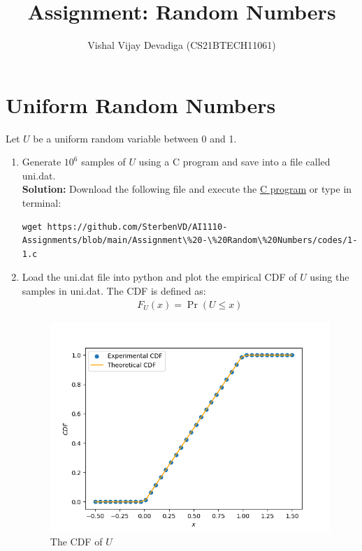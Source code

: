 \documentclass[journal,12pt,twocolumn]{IEEEtran}
\title{Assignment: Random Numbers}
\author{Vishal Vijay Devadiga (CS21BTECH11061)}
\date{}
\numberwithin{equation}{section}
\renewcommand\thesection{\arabic{section}}
\providecommand{\pr}[1]{\ensuremath{\Pr\left(#1\right)}}
\providecommand{\gitlink}[2]{{\color{blue}\href{https://github.com/SterbenVD/AI1110-Assignments/blob/main/Assignment\%20-\%20Random\%20Numbers/#1}{#2}}}
\newcommand{\solution}{\noindent \textbf{\\ Solution: }}
\begin{document}
\maketitle

\section{Uniform Random Numbers}
Let $U$ be a uniform random variable between 0 and 1.
\begin{enumerate}[label=\thesection.\arabic*,ref=\thesection.\theenumi]
    \item Generate $10^6$ samples of $U$ using a C program and save into a file called uni.dat.
          \solution Download the following file and execute the \gitlink{codes/1-1.c}{C program} or type in terminal:
          \begin{lstlisting}
wget https://github.com/SterbenVD/AI1110-Assignments/blob/main/Assignment\%20-\%20Random\%20Numbers/codes/1-1.c
            \end{lstlisting}
    \item
          Load the uni.dat file into python and plot the empirical CDF of $U$ using the samples in uni.dat.
          The CDF is defined as:
          \begin{align}
              F_{U}(x) = \pr{U \le x}
          \end{align}
          \begin{figure}[H]
              \centering
              \includegraphics[width = \columnwidth]{../figs/1_cdf.png}
              \caption{The CDF of $U$}
              \label{fig:1_cdf}

\end{figure}
\end{enumerate}
\end{document}
